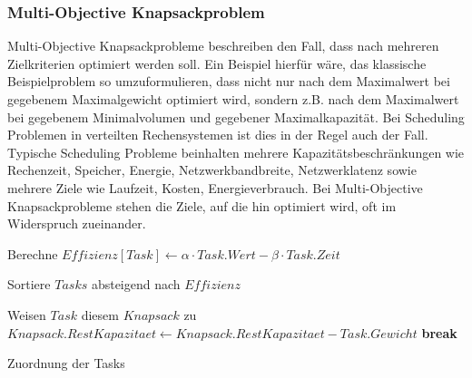 \subsubsection{Multi-Objective Knapsackproblem}

Multi-Objective Knapsackprobleme beschreiben den Fall, dass nach mehreren Zielkriterien optimiert werden soll. Ein Beispiel hierfür wäre, das klassische Beispielproblem so umzuformulieren, dass nicht nur nach dem Maximalwert bei gegebenem Maximalgewicht optimiert wird, sondern z.B. nach dem Maximalwert bei gegebenem Minimalvolumen und gegebener Maximalkapazität. Bei Scheduling Problemen in verteilten Rechensystemen ist dies in der Regel auch der Fall. Typische Scheduling Probleme beinhalten mehrere Kapazitätsbeschränkungen wie Rechenzeit, Speicher, Energie, Netzwerkbandbreite, Netzwerklatenz sowie mehrere Ziele wie Laufzeit, Kosten, Energieverbrauch. Bei Multi-Objective Knapsackprobleme stehen die Ziele, auf die hin optimiert wird, oft im Widerspruch zueinander.

\begin{algorithmic}
    
        \State Berechne $Effizienz[Task] \leftarrow \alpha \cdot Task.Wert - \beta \cdot Task.Zeit$
    \EndFor
    
    \State Sortiere $Tasks$ absteigend nach $Effizienz$
    
                \State Weisen $Task$ diesem $Knapsack$ zu
                \State $Knapsack.RestKapazitaet \leftarrow Knapsack.RestKapazitaet - Task.Gewicht$
                \State \textbf{break}
            \EndIf
        \EndFor
    \EndFor

    \State \Return Zuordnung der Tasks
    \EndFunction
\end{algorithmic}